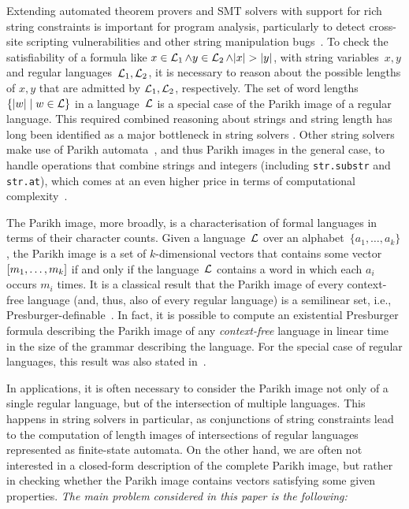 Extending automated theorem provers and SMT solvers with support for rich string
constraints is important for program analysis, particularly to detect cross-site
scripting vulnerabilities and other string manipulation
bugs~\cite{DBLP:books/sp/BultanYAA17}.
%
To check the satisfiability of a formula like $x \in \operatorname{\mathcal{L}}_1 \wedge y \in \operatorname{\mathcal{L}}_2
\wedge |x| > |y|$, with string variables~$x, y$ and regular
languages~$\operatorname{\mathcal{L}}_1, \operatorname{\mathcal{L}}_2$, it is necessary to reason
about the possible lengths of $x, y$ that are admitted by
$\operatorname{\mathcal{L}}_1, \operatorname{\mathcal{L}}_2$, respectively. The
set of word lengths $\{ |w| \mid w \in \operatorname{\mathcal{L}}\}$ in a language~$\operatorname{\mathcal{L}}$
is a special case of the Parikh image of a regular language.
This required combined reasoning about
strings and string length has long been identified as a major bottleneck in
string solvers
\cite{DBLP:conf/cav/AbdullaACHRRS15,length-aware-solver,approximate-parikh,DBLP:journals/corr/BerzishZG17}.
Other string solvers make use of Parikh automata~\cite{parikh-automata}, and
thus Parikh images in the general case, to handle operations that combine
strings and integers (including
\verb!str.substr!  and \verb!str.at!), which comes at an even higher price in
terms of computational complexity~\cite{ostrich-plus}.

The Parikh image, more broadly, is a characterisation of formal
languages in terms of their character counts. Given a
language~$\operatorname{\mathcal{L}}$ over an alphabet~$\{a_1, \ldots, a_k\}$, the
Parikh image is a set of $k$-dimensional vectors that contains some
vector~$\left[{m_1, \ldots, m_k}\right]$ if and only if the
language~$\operatorname{\mathcal{L}}$ contains a word in which each $a_i$ occurs $m_i$
times. It is a classical result that the Parikh image of every
context-free language (and, thus, also of every regular language) is a
semilinear set, i.e., Presburger-definable~\cite{parikh-theorem}.
In
fact, it is possible to compute an existential Presburger formula
describing the Parikh image of any \emph{context-free} language in
linear time~\cite{generate-parikh-image} in the size of the grammar
describing the language. For the special case of
regular languages, this result was also stated
in~\cite{muscholl-linear}.

In applications,  it is often necessary   
to consider the Parikh image not only of a single regular language, but of the
intersection of multiple languages.
This happens in string solvers in
particular, as conjunctions of string constraints lead to the computation of
length images of intersections of regular languages represented as
finite-state automata.
On the other hand, we are often
not interested in a closed-form description of the complete Parikh image,
but rather in checking whether the Parikh image contains vectors satisfying
some given properties. 
\emph{The main problem considered in this paper is the following:}

